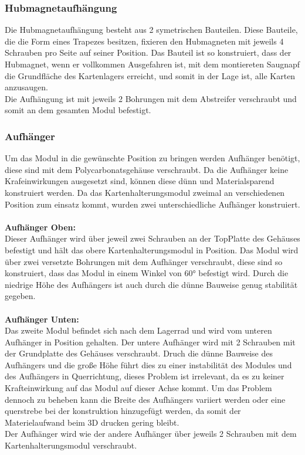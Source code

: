 \subsubsection{Hubmagnetaufhängung}

Die Hubmagnetaufhängung besteht aus 2 symetrischen Bauteilen. Diese Bauteile, die die Form eines Trapezes besitzen, fixieren den
Hubmagneten mit jeweils 4 Schrauben pro Seite auf seiner Position. Das Bauteil ist so konstruiert, dass der Hubmagnet, wenn er
vollkommen Ausgefahren ist, mit dem montiereten Saugnapf die Grundfläche des Kartenlagers erreicht, und somit in der Lage ist,
alle Karten anzusaugen.\\
Die Aufhängung ist mit jeweils 2 Bohrungen mit dem Abstreifer verschraubt und somit an dem gesamten Modul befestigt.

\subsubsection{Aufhänger}
Um das Modul in die gewünschte Position zu bringen werden Aufhänger benötigt, diese sind mit dem Polycarbonatsgehäuse verschraubt.
Da die Aufhänger keine Krafeinwirkungen ausgesetzt sind, können diese dünn und Materialsparend konstruiert werden.
Da das Kartenhalterungsmodul zweimal an verschiedenen Position zum einsatz kommt, wurden zwei unterschiedliche
Aufhänger konstruiert.\\\\
\textbf{Aufhänger Oben:} \\
Dieser Aufhänger wird über jeweil zwei Schrauben an der TopPlatte des Gehäuses befestigt und hält das obere Kartenhalterungsmodul in Position.
Das Modul wird über zwei versetzte Bohrungen mit dem Aufhänger verschraubt, diese sind so konstruiert, dass das Modul in einem
Winkel von 60° befestigt wird.
Durch die niedrige Höhe des Aufhängers ist auch durch die dünne Bauweise genug stabilität gegeben.\\\\
\textbf{Aufhänger Unten:}\\
Das zweite Modul befindet sich nach dem Lagerrad und wird vom unteren Aufhänger in Position gehalten. Der untere Aufhänger
wird mit 2 Schrauben mit der Grundplatte des Gehäuses verschraubt. Druch die dünne Bauweise des Aufhängers und die
große Höhe führt dies zu einer instabilität des Modules und des Aufhängers in Querrichtung, dieses Problem ist irrelevant, da es
zu keiner Krafteinwirkung auf das Modul auf dieser Achse kommt. Um das Problem dennoch zu beheben kann die Breite des
Aufhängers variiert werden oder eine querstrebe bei der konstruktion hinzugefügt werden, da somit der Materielaufwand beim 3D
drucken gering bleibt.\\
Der Aufhänger wird wie der andere Aufhänger über jeweils 2 Schrauben mit dem Kartenhalterungsmodul verschraubt.

